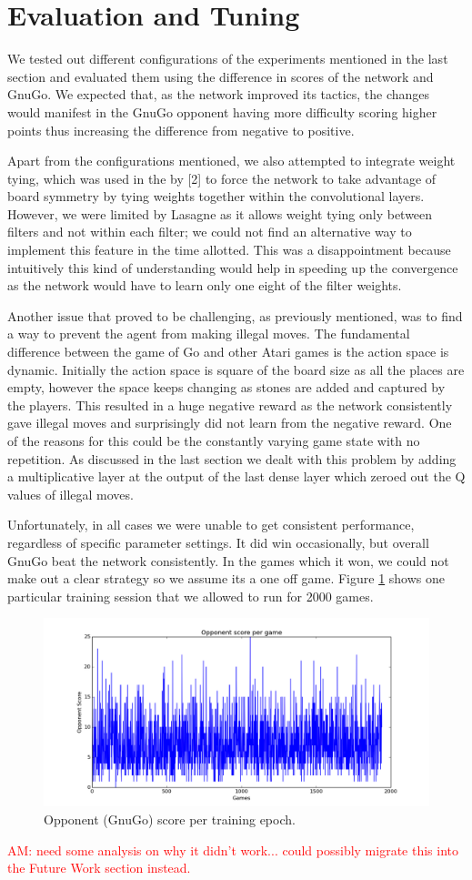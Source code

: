 \section{Evaluation and Tuning}

We tested out different configurations of the experiments mentioned in the last section and evaluated them using the difference in scores of the network and GnuGo. We expected that, as the network improved its tactics, the changes would manifest in the GnuGo opponent having more difficulty scoring higher points thus increasing the difference from negative to positive.

Apart from the configurations mentioned, we also attempted to integrate weight tying, which was used in the by [2] to force the network to take advantage of board symmetry by tying weights together within the convolutional layers. However, we were limited by Lasagne as it allows weight tying only between filters and not within each filter; we could not find an alternative way to implement this feature in the time allotted. This was a disappointment because intuitively this kind of understanding would help in speeding up the convergence as the network would have to learn only one eight of the filter weights. 

Another issue that proved to be challenging, as previously mentioned, was to find a way to prevent the agent from making illegal moves. The fundamental difference between the game of Go and other Atari games is the action space is dynamic. Initially the action space is square of the board size as all the places are empty, however the space keeps changing as stones are added and captured by the players. This resulted in a huge negative reward as the network consistently gave illegal moves and surprisingly did not learn from the negative reward. One of the reasons for this could be the constantly varying game state with no repetition. As discussed in the last section we dealt with this problem by adding a multiplicative layer at the output of the last dense layer which zeroed out the Q values of illegal moves.  

Unfortunately, in all cases we were unable to get consistent performance, regardless of specific parameter settings. It did win occasionally, but overall GnuGo beat the network consistently. In the games which it won, we could not make out a clear strategy so we assume its a one off game. Figure \ref{fig:score} shows one particular training session that we allowed to run for 2000 games. 

\begin{figure}[h!]
\centering
\includegraphics[scale=0.5]{training_score.png}
\caption{Opponent (GnuGo) score per training epoch.}
\label{fig:score}
\end{figure}


\textcolor{red}{AM: need some analysis on why it didn't work... could possibly migrate this into the Future Work section instead.}
